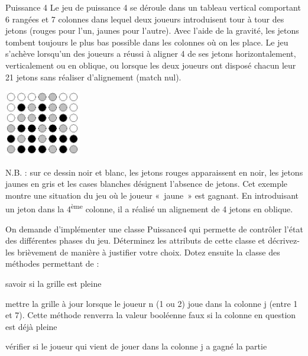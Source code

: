 \begin{Exercice}{Puissance 4}
	Le jeu de puissance 4 se déroule dans un tableau vertical comportant 6
	rangées et 7 colonnes dans lequel deux joueurs introduisent tour à tour
	des jetons (rouges pour l’un, jaunes pour l’autre). Avec l’aide de la
	gravité, les jetons tombent toujours le plus bas possible dans les
	colonnes où on les place. Le jeu s’achève lorsqu’un des joueurs a
	réussi à aligner 4 de ses jetons horizontalement, verticalement ou en
	oblique, ou lorsque les deux joueurs ont disposé chacun leur 21 jetons
	sans réaliser d’alignement (match nul).


	
		\begin{center}
		\includegraphics[width=0.25\textwidth]{image/puissance4}
		\end{center}
		N.B. : sur ce dessin noir et
		blanc, les jetons rouges apparaissent en noir, les jetons jaunes en
		gris et les cases blanches désignent l'absence de
		jetons. Cet exemple montre une situation du jeu où le joueur «~jaune~»
		est gagnant. En introduisant un jeton dans la
		4\textsuperscript{ème} colonne,
		il a réalisé un alignement de 4 jetons en oblique.

	
	On demande d’implémenter une classe Puissance4 qui permette de contrôler
	l’état des différentes phases du jeu. Déterminez les attributs de cette
	classe et décrivez-les brièvement de manière à justifier votre choix.
	Dotez ensuite la classe des méthodes permettant de :

	\begin{liste}
		\item 
			savoir si la grille est pleine
		\item 
			mettre la grille à jour lorsque le joueur n (1 ou 2) joue dans la
			colonne j (entre 1 et 7). Cette méthode renverra la valeur booléenne
			faux si la colonne en question est déjà pleine
		\item 
			vérifier si le joueur qui vient de jouer dans la colonne j a gagné la
			partie
	\end{liste}
	

\end{Exercice}
